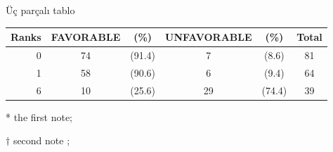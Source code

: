 \begin{center}
\begin{threeparttable}
   \renewcommand{\arraystretch}{1.3}
    \caption{Üç parçalı tablo}
    \label{tablo:UP} %
       \begin{tabular}{rccccc}
	    \hline\hline
	    Ranks & FAVORABLE \tnote{*} &(\%) & UNFAVORABLE &(\%) & Total \\ \hline
	    0 & 74 & (91.4) & 7 & (8.6) & 81 \\ 
	    1 & 58 & (90.6) & 6 & (9.4) & 64 \\ 
	    6 & 10 & (25.6) & 29 & (74.4) & 39 \\\hline
	    \end{tabular}
\begin{tablenotes}
 \footnotesize
	\item[*] the first note; %
	\item[$\dag$] second note ; %
\end{tablenotes}
\end{threeparttable}
\end{center}

